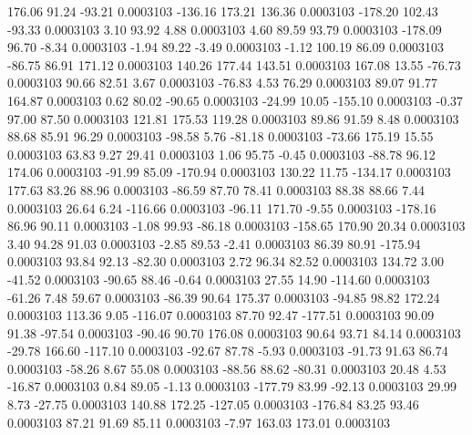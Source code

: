       176.06       91.24      -93.21     0.0003103
     -136.16      173.21      136.36     0.0003103
     -178.20      102.43      -93.33     0.0003103
        3.10       93.92        4.88     0.0003103
        4.60       89.59       93.79     0.0003103
     -178.09       96.70       -8.34     0.0003103
       -1.94       89.22       -3.49     0.0003103
       -1.12      100.19       86.09     0.0003103
      -86.75       86.91      171.12     0.0003103
      140.26      177.44      143.51     0.0003103
      167.08       13.55      -76.73     0.0003103
       90.66       82.51        3.67     0.0003103
      -76.83        4.53       76.29     0.0003103
       89.07       91.77      164.87     0.0003103
        0.62       80.02      -90.65     0.0003103
      -24.99       10.05     -155.10     0.0003103
       -0.37       97.00       87.50     0.0003103
      121.81      175.53      119.28     0.0003103
       89.86       91.59        8.48     0.0003103
       88.68       85.91       96.29     0.0003103
      -98.58        5.76      -81.18     0.0003103
      -73.66      175.19       15.55     0.0003103
       63.83        9.27       29.41     0.0003103
        1.06       95.75       -0.45     0.0003103
      -88.78       96.12      174.06     0.0003103
      -91.99       85.09     -170.94     0.0003103
      130.22       11.75     -134.17     0.0003103
      177.63       83.26       88.96     0.0003103
      -86.59       87.70       78.41     0.0003103
       88.38       88.66        7.44     0.0003103
       26.64        6.24     -116.66     0.0003103
      -96.11      171.70       -9.55     0.0003103
     -178.16       86.96       90.11     0.0003103
       -1.08       99.93      -86.18     0.0003103
     -158.65      170.90       20.34     0.0003103
        3.40       94.28       91.03     0.0003103
       -2.85       89.53       -2.41     0.0003103
       86.39       80.91     -175.94     0.0003103
       93.84       92.13      -82.30     0.0003103
        2.72       96.34       82.52     0.0003103
      134.72        3.00      -41.52     0.0003103
      -90.65       88.46       -0.64     0.0003103
       27.55       14.90     -114.60     0.0003103
      -61.26        7.48       59.67     0.0003103
      -86.39       90.64      175.37     0.0003103
      -94.85       98.82      172.24     0.0003103
      113.36        9.05     -116.07     0.0003103
       87.70       92.47     -177.51     0.0003103
       90.09       91.38      -97.54     0.0003103
      -90.46       90.70      176.08     0.0003103
       90.64       93.71       84.14     0.0003103
      -29.78      166.60     -117.10     0.0003103
      -92.67       87.78       -5.93     0.0003103
      -91.73       91.63       86.74     0.0003103
      -58.26        8.67       55.08     0.0003103
      -88.56       88.62      -80.31     0.0003103
       20.48        4.53      -16.87     0.0003103
        0.84       89.05       -1.13     0.0003103
     -177.79       83.99      -92.13     0.0003103
       29.99        8.73      -27.75     0.0003103
      140.88      172.25     -127.05     0.0003103
     -176.84       83.25       93.46     0.0003103
       87.21       91.69       85.11     0.0003103
       -7.97      163.03      173.01     0.0003103
